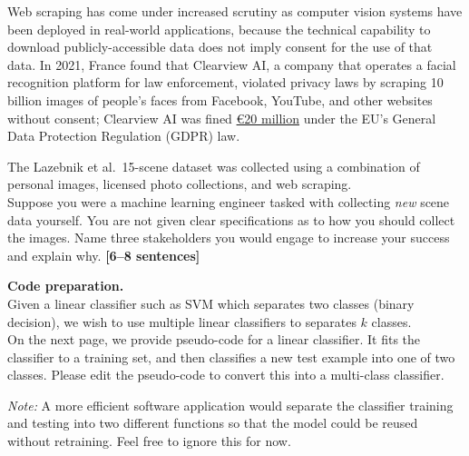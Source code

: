 \documentclass{csci1430}
\begin{document}
Web scraping has come under increased scrutiny as computer vision systems have been deployed in real-world applications, because the technical capability to download publicly-accessible data does not imply consent for the use of that data. In 2021, France found that Clearview AI, a company that operates a facial recognition platform for law enforcement, violated privacy laws by scraping 10 billion images of people's faces from Facebook, YouTube, and other websites without consent; Clearview AI was fined \href{https://www.edpb.europa.eu/news/national-news/2022/french-sa-fines-clearview-ai-eur-20-million\_en}{€20 million} under the EU's General Data Protection Regulation (GDPR) law.


\begin{subquestion}[points=4]
The Lazebnik et al.~15-scene dataset was collected using a combination of personal images, licensed photo collections, and web scraping. \\
    
Suppose you were a machine learning engineer tasked with collecting \emph{new} scene data yourself. You are not given clear specifications as to how you should collect the images. Name three stakeholders you would engage to increase your success and explain why. \textbf{[6--8 sentences]}
\end{subquestion}

\begin{answer}[height=20]

\end{answer}

\pagebreak
\begin{question}[points=6]
\textbf{Code preparation.}\\
Given a linear classifier such as SVM which separates two classes (binary decision), we wish to use multiple linear classifiers to separates $k$ classes. \\

On the next page, we provide pseudo-code for a linear classifier. It fits the classifier to a training set, and then classifies a new test example into one of two classes. Please edit the pseudo-code to convert this into a multi-class classifier. 
\end{question}

\emph{Note:} A more efficient software application would separate the classifier training and testing into two different functions so that the model could be reused without retraining. Feel free to ignore this for now.
\end{document}
